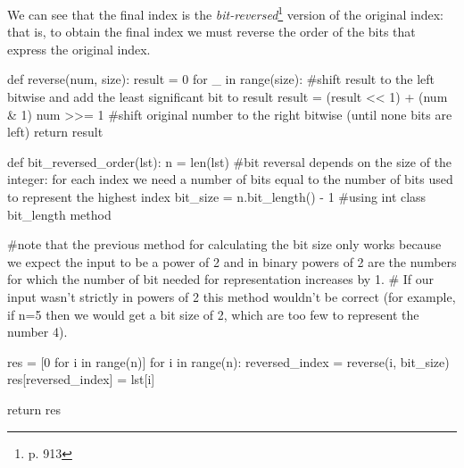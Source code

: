 \documentclass[class=article,crop=false]{standalone}
\begin{document}
We can see that the final index is the \textit{bit-reversed}\footnote{\cite{introalgo} p. 913} version of the original index: that is, to obtain the final index we must reverse the order of the bits that express the original index.
\begin{py}
def reverse(num, size):
result = 0
for _ in range(size): #shift result to the left bitwise and add the least significant bit to result
result = (result << 1) + (num & 1)
num >>= 1 #shift original number to the right bitwise (until none bits are left)
return result

def bit_reversed_order(lst):
n = len(lst)
#bit reversal depends on the size of the integer: for each index we need a number of bits equal to the number of bits used to represent the highest index
bit_size = n.bit_length() - 1 #using int class bit_length method

#note that the previous method for calculating the bit size only works because we expect the input to be a power of 2 and in binary powers of 2 are the numbers for which the number of bit needed for representation increases by 1. 
# If our input wasn't strictly in powers of 2 this method wouldn't be correct (for example, if n=5 then we would get a bit size of 2, which are too few to represent the number 4).

res = [0 for i in range(n)]
for i in range(n):
reversed_index = reverse(i, bit_size)
res[reversed_index] = lst[i]

return res
\end{py}
\end{document}
